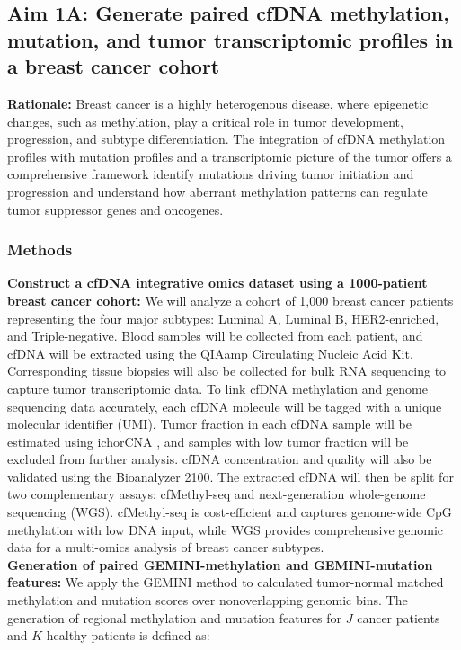 \documentclass[11pt]{article}
\begin{document}
\subsection*{Aim 1A: Generate paired cfDNA methylation, mutation, and tumor transcriptomic profiles in a breast cancer cohort}
\textbf{Rationale:}
Breast cancer is a highly heterogenous disease, where epigenetic changes, such as methylation, 
play a critical role in tumor development, progression, and subtype differentiation. \cite{guo_breast_2023}
The integration of cfDNA methylation profiles with mutation profiles and a transcriptomic picture of the tumor offers a comprehensive framework identify mutations driving tumor initiation and progression and understand how aberrant methylation patterns can regulate tumor suppressor genes and oncogenes.
\subsubsection*{Methods}
\textbf{Construct a cfDNA integrative omics dataset using a 1000-patient breast cancer cohort:}
We will analyze a cohort of 1,000 breast cancer patients representing the four major subtypes: Luminal A, Luminal B, HER2-enriched, and Triple-negative. \cite{guo_breast_2023}
Blood samples will be collected from each patient, and cfDNA will be extracted using the QIAamp Circulating Nucleic Acid Kit.
Corresponding tissue biopsies will also be collected for bulk RNA sequencing to capture tumor transcriptomic data.
To link cfDNA methylation and genome sequencing data accurately, each cfDNA molecule will be tagged with a unique molecular identifier (UMI).
Tumor fraction in each cfDNA sample will be estimated using ichorCNA \cite{adalsteinsson_scalable_2017}, and samples with low tumor fraction will be excluded from further analysis.
cfDNA concentration and quality will also be validated using the Bioanalyzer 2100. \cite{polatoglou_isolation_2022}
The extracted cfDNA will then be split for two complementary assays: cfMethyl-seq and next-generation whole-genome sequencing (WGS). cfMethyl-seq is cost-efficient and captures genome-wide CpG methylation with low DNA input, while WGS provides comprehensive genomic data for a multi-omics analysis of breast cancer subtypes.
\medskip \\
\textbf{Generation of paired GEMINI-methylation and GEMINI-mutation features:}
We apply the GEMINI method \cite{bruhm_single-molecule_2023} to calculated tumor-normal matched methylation and mutation
scores over nonoverlapping genomic bins.
The generation of regional methylation and mutation features for $J$ cancer patients and $K$ healthy patients is defined as:
\end{document}
